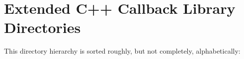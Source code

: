 \section{Extended C++ Callback Library Directories}
This directory hierarchy is sorted roughly, but not completely, alphabetically:\begin{CompactList}
\item {}
\begin{CompactList}
\item {}
\begin{CompactList}
\item {}
\item {}
\item {}
\item {}
\end{CompactList}
\end{CompactList}
\end{CompactList}
